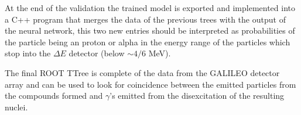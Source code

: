 At the end of the validation the trained model is exported and implemented into a C++ program that merges the data of the previous trees with the output of the neural network, this two new entries should be interpreted as probabilities of the particle being an proton or alpha in the energy range of the particles which stop into the $\Delta E$ detector (below $\sim \num{4}/\num{6}$ MeV). 

The final ROOT TTree is complete of the data from the GALILEO detector array and can be used to look for coincidence between the emitted particles from the compounds formed and $\gamma$'s emitted from the disexcitation of the resulting nuclei.





